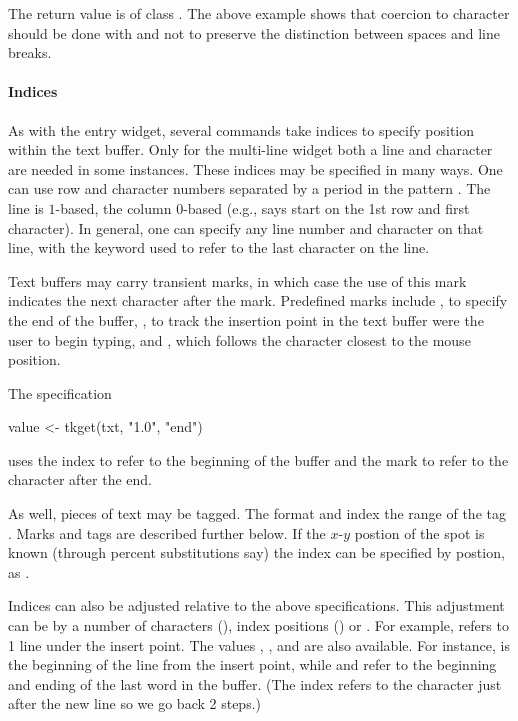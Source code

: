 The return value is of class .  The above example shows
that coercion to character
should be done with  and not
 to preserve the distinction between spaces and
line breaks.


\paragraph{Indices}
As with the entry widget, several commands take indices to specify
position within the text buffer. Only for the multi-line widget both a
line and character are needed in some instances. These indices may be
specified in many ways. One can use row and character numbers
separated by a period in the pattern . The line is
$1$-based, the column $0$-based (e.g.,  says start on the
1st row and first character). In general, one can specify any line number and character on
that line, with the keyword  used to refer to the last
character on the line.

Text buffers may carry transient marks, in which case the use of this
mark indicates the next character after the mark. Predefined marks
include , to specify the end of the buffer, ,
to track the insertion point in the text buffer were the user to begin
typing, and , which follows the character closest to the
mouse position.

The specification
\begin{Schunk}
\begin{Sinput}
 value <- tkget(txt, "1.0", "end")
\end{Sinput}
\end{Schunk}
uses the index  to refer to the beginning of the buffer and
the mark  to refer to the character after the end.

As well, pieces of text may be tagged. The format  and
 index the range of the tag . Marks and tags
are described further below. If the $x$-$y$ postion of the spot is known
(through percent substitutions say) the index can be specified by
postion, as .

Indices can also be adjusted relative to the above
specifications. This adjustment can be by a number of characters
(), index positions () or . For
example,  refers to 1 line under the insert
point. The values , , 
and  are also available. For instance,  is the beginning of the line from the insert point, while
 and  refer to the
beginning and ending of the last word in the buffer. (The 
index refers to the character just after the new line so we go back 2
steps.)

